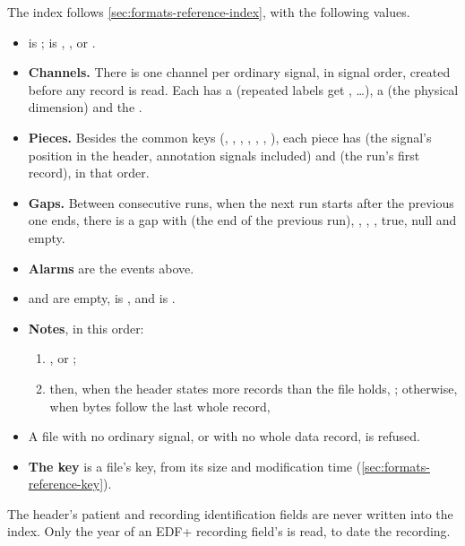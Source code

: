 The index follows \cref{sec:formats-reference-index}, with the following values.
\begin{itemize}
\item {} is ;  is , ,  or
  .
\item \textbf{Channels.} There is one channel per ordinary signal, in signal order, created
  before any record is read. Each has a  (repeated labels get ,
   \dots), a  (the physical dimension) and the 
  .
\item \textbf{Pieces.} Besides the common keys (, , , ,
  , , ), each piece has  (the signal's position in the
  header, annotation signals included) and  (the run's first record), in that
  order.
\item \textbf{Gaps.} Between consecutive runs, when the next run starts after the previous one
  ends, there is a gap with  (the end of the previous run), , 
  , ,  true,  null and
   empty.
\item \textbf{Alarms} are the events above.
\item {} and  are empty,  is \code{\{\}}, and
   is \code{\{\}}.
\item \textbf{Notes}, in this order:
  \begin{enumerate}
  \item {}, or ;
  \item then, when the header states more records than the file holds, ; otherwise, when bytes follow the last whole record,
  \end{enumerate}
\item A file with no ordinary signal, or with no whole data record, is refused.
\item \textbf{The key} is a file's key, from its size and modification time
  (\cref{sec:formats-reference-key}).
\end{itemize}

The header's patient and recording identification fields are never written into the index.
Only the year of an EDF+ recording field's  is read, to date the recording.

